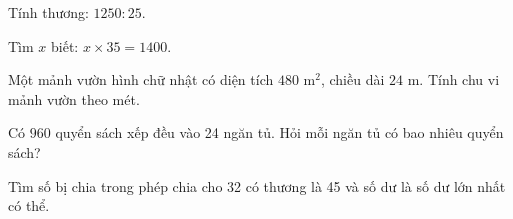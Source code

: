 \begin{ex} %
Tính thương: $1250 : 25$.
\end{ex}

\begin{ex} %
Tìm $x$ biết: $x \times 35 = 1400$.
\end{ex}

\begin{ex} %
Một mảnh vườn hình chữ nhật có diện tích $480\text{ m}^2$, chiều dài $24\text{ m}$. Tính chu vi mảnh vườn theo mét.
\end{ex}

\begin{ex} %
Có $960$ quyển sách xếp đều vào 24 ngăn tủ. Hỏi mỗi ngăn tủ có bao nhiêu quyển sách?
\end{ex}

\begin{ex} %
Tìm số bị chia trong phép chia cho 32 có thương là 45 và số dư là số dư lớn nhất có thể.
\end{ex}
